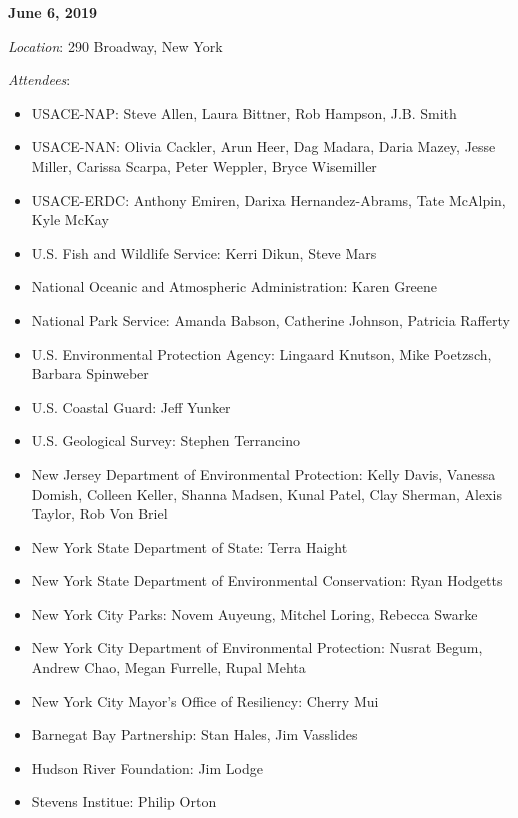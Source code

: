 \documentclass[
]{book}
\providecommand{\tightlist}{%
  \setlength{\itemsep}{0pt}\setlength{\parskip}{0pt}}
\begin{document}
\textbf{June 6, 2019}

\emph{Location}: 290 Broadway, New York

\emph{Attendees}:

\begin{itemize}
\tightlist
\item
  USACE-NAP: Steve Allen, Laura Bittner, Rob Hampson, J.B. Smith\\
\item
  USACE-NAN: Olivia Cackler, Arun Heer, Dag Madara, Daria Mazey, Jesse Miller, Carissa Scarpa, Peter Weppler, Bryce Wisemiller\\
\item
  USACE-ERDC: Anthony Emiren, Darixa Hernandez-Abrams, Tate McAlpin, Kyle McKay\\
\item
  U.S. Fish and Wildlife Service: Kerri Dikun, Steve Mars\\
\item
  National Oceanic and Atmospheric Administration: Karen Greene\\
\item
  National Park Service: Amanda Babson, Catherine Johnson, Patricia Rafferty\\
\item
  U.S. Environmental Protection Agency: Lingaard Knutson, Mike Poetzsch, Barbara Spinweber\\
\item
  U.S. Coastal Guard: Jeff Yunker\\
\item
  U.S. Geological Survey: Stephen Terrancino\\
\item
  New Jersey Department of Environmental Protection: Kelly Davis, Vanessa Domish, Colleen Keller, Shanna Madsen, Kunal Patel, Clay Sherman, Alexis Taylor, Rob Von Briel\\
\item
  New York State Department of State: Terra Haight\\
\item
  New York State Department of Environmental Conservation: Ryan Hodgetts
\item
  New York City Parks: Novem Auyeung, Mitchel Loring, Rebecca Swarke\\
\item
  New York City Department of Environmental Protection: Nusrat Begum, Andrew Chao, Megan Furrelle, Rupal Mehta\\
\item
  New York City Mayor's Office of Resiliency: Cherry Mui\\
\item
  Barnegat Bay Partnership: Stan Hales, Jim Vasslides\\
\item
  Hudson River Foundation: Jim Lodge\\
\item
  Stevens Institue: Philip Orton
\end{itemize}
\end{document}
